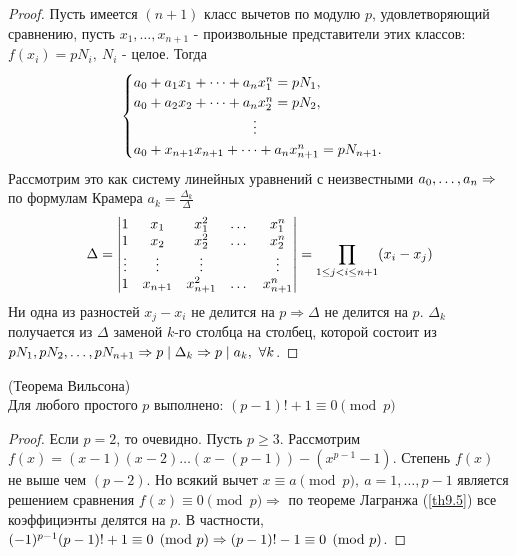     \begin{proof}
        Пусть имеется $(n+1)$ класс вычетов по модулю $p$, удовлетворяющий сравнению, пусть $x_1,\dots,x_{n+1}$ - произвольные представители этих классов: $f(x_i)=pN_i,\ N_i$ - целое. Тогда 
        \[\begin{cases}
            a_0+a_1 x_1+\dots+a_n x_1^n=pN_1,\\
            a_0+a_2 x_2+\dots+a_n x_2^n=pN_2,\\
            \tab[3cm]\vdots\\
            a_0+x_{n+1} x_{n+1}+\dots+a_n x_{n+1}^n=p N_{n+1}.
        \end{cases}\]
        Рассмотрим это как систему линейных уравнений с неизвестными $a_0,\dots, a_n\\
        \Rightarrow$ по формулам Крамера $a_k=\frac{\Delta_k}{\Delta}$
        \[\Delta=\begin{vmatrix}
            1 & x_1 & x_1^2 & \dots & x_1^n\\
            1 & x_2 & x_2^2 & \dots & x_2^n\\
            \vdots & \vdots & \vdots & \null & \vdots\\
            1 & x_{n+1} & x_{n+1}^2 & \dots & x_{n+1}^n
        \end{vmatrix} = \prod\limits_{1\leq j < i\leq n+1}(x_i-x_j)\]
        Ни одна из разностей $x_j-x_i$ не делится на $p \Rightarrow \Delta$ не делится на $p$. $\Delta_k$ получается из $\Delta$ заменой $k$-го столбца на столбец, которой состоит из $pN_1,pN_2,\dots,pN_{n+1}\\
        \Rightarrow p\div \Delta_k \Rightarrow p\div a_k,\ \forall k$.
    \end{proof} 
    \begin{theorem}(Теорема Вильсона)\label{th9.6} \\
        Для любого простого $p$ выполнено: $(p-1)!+1\equiv 0\pmod{p}$
    \end{theorem} 
    \begin{proof}
        Если $p=2$, то очевидно. Пусть $p\geq 3$. Рассмотрим\\
        $f(x)=(x-1)(x-2)\dots (x-(p-1))-(x^{p-1}-1)$. Степень $f(x)$ не выше чем $(p-2)$. Но всякий вычет $x\equiv a\pmod{p},\ a=1,\dots, p-1$ является решением сравнения $f(x)\equiv 0 \pmod{p} \Rightarrow$ по теореме Лагранжа (\ref{th9.5}) все коэффициэнты делятся на $p$. В частности, $(-1)^{p-1}(p-1)!+1\equiv 0\pmod{p}\\
        \Rightarrow (p-1)!-1\equiv0\pmod{p}$.
    \end{proof} 
